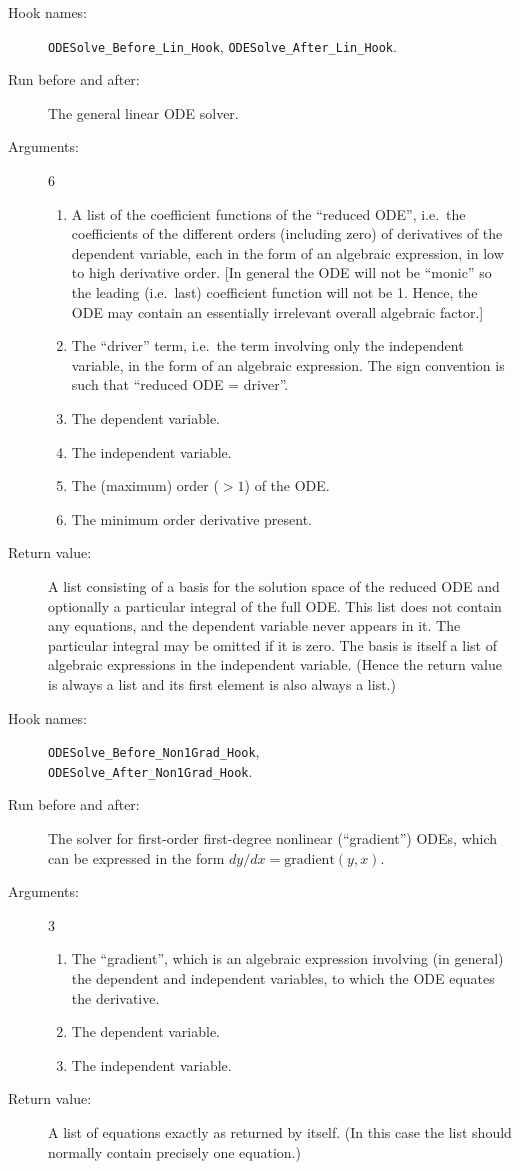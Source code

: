\begin{description}
\item[Hook names:] \verb|ODESolve_Before_Lin_Hook|,
\verb|ODESolve_After_Lin_Hook|.
\item[Run before and after:] The general linear ODE solver.
\item[Arguments:] 6
\begin{enumerate}
\item A list of the coefficient functions of the ``reduced ODE'',
i.e.\ the coefficients of the different orders (including zero) of
derivatives of the dependent variable, each in the form of an
algebraic expression, in low to high derivative order.  [In general
the ODE will not be ``monic'' so the leading (i.e.\ last) coefficient
function will not be 1.  Hence, the ODE may contain an essentially
irrelevant overall algebraic factor.]
\item The ``driver'' term, i.e.\ the term involving only the
independent variable, in the form of an algebraic expression.  The
sign convention is such that ``reduced ODE = driver''.
\item The dependent variable.
\item The independent variable.
\item The (maximum) order ($> 1$) of the ODE.
\item The minimum order derivative present.
\end{enumerate}
\item[Return value:] A list consisting of a basis for the solution
space of the reduced ODE and optionally a particular integral of the
full ODE\@.  This list does not contain any equations, and the dependent
variable never appears in it.  The particular integral may be omitted
if it is zero.  The basis is itself a list of algebraic expressions in
the independent variable.  (Hence the return value is always a list
and its first element is also always a list.)
\end{description}

\noindent\hrulefill

\begin{description}
\item[Hook names:] \verb|ODESolve_Before_Non1Grad_Hook|, \\
\verb|ODESolve_After_Non1Grad_Hook|.
\item[Run before and after:] The solver for first-order first-degree
nonlinear (``gradient'') ODEs, which can be expressed in the form
$dy/dx = \mathrm{gradient}(y,x)$.
\item[Arguments:] 3
\begin{enumerate}
\item The ``gradient'', which is an algebraic expression involving (in
general) the dependent and independent variables, to which the ODE
equates the derivative.
\item The dependent variable.
\item The independent variable.
\end{enumerate}
\item[Return value:] A list of equations exactly as returned by
 itself.  (In this case the list should normally contain
precisely one equation.)
\end{description}

